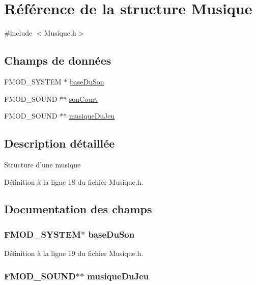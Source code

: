 \hypertarget{struct_musique}{\section{Référence de la structure Musique}
\label{struct_musique}
}


{\ttfamily \#include $<$Musique.\-h$>$}

\subsection*{Champs de données}
\begin{DoxyCompactItemize}
\item 
F\-M\-O\-D\-\_\-\-S\-Y\-S\-T\-E\-M $\ast$ \hyperlink{struct_musique_a690ab19d5ecae7922968f095c2419c99}{base\-Du\-Son}
\item 
F\-M\-O\-D\-\_\-\-S\-O\-U\-N\-D $\ast$$\ast$ \hyperlink{struct_musique_a752d8e2529422bc4d30b26cdbe9718bb}{son\-Court}
\item 
F\-M\-O\-D\-\_\-\-S\-O\-U\-N\-D $\ast$$\ast$ \hyperlink{struct_musique_aeff2950f6f21b075b1e7d18ddd28336d}{musique\-Du\-Jeu}
\end{DoxyCompactItemize}


\subsection{Description détaillée}
Structure d'une musique 

Définition à la ligne 18 du fichier Musique.\-h.



\subsection{Documentation des champs}
\hypertarget{struct_musique_a690ab19d5ecae7922968f095c2419c99}{
\subsubsection[{base\-Du\-Son}]{\setlength{\rightskip}{0pt plus 5cm}F\-M\-O\-D\-\_\-\-S\-Y\-S\-T\-E\-M$\ast$ base\-Du\-Son}}\label{struct_musique_a690ab19d5ecae7922968f095c2419c99}


Définition à la ligne 19 du fichier Musique.\-h.

\hypertarget{struct_musique_aeff2950f6f21b075b1e7d18ddd28336d}{
\subsubsection[{musique\-Du\-Jeu}]{\setlength{\rightskip}{0pt plus 5cm}F\-M\-O\-D\-\_\-\-S\-O\-U\-N\-D$\ast$$\ast$ musique\-Du\-Jeu}}\label{struct_musique_aeff2950f6f21b075b1e7d18ddd28336d}


